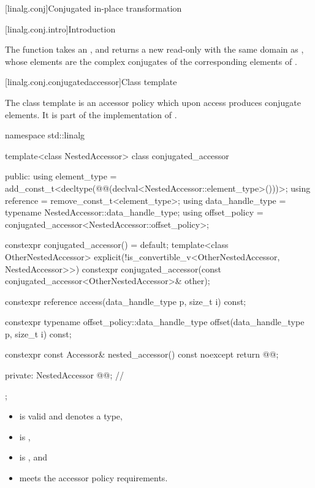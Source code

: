 [linalg.conj]{Conjugated in-place transformation}

[linalg.conj.intro]{Introduction}

\pnum
The  function takes an  ,
and returns a new read-only  
with the same domain as ,
whose elements are the complex conjugates
of the corresponding elements of .

[linalg.conj.conjugatedaccessor]{Class template }

\pnum
The class template 
is an  accessor policy
which upon access produces conjugate elements.
It is part of the implementation of
.

\begin{codeblock}
namespace std::linalg {
  template<class NestedAccessor>
  class conjugated_accessor {
  public:
    using element_type =
      add_const_t<decltype(@@(declval<NestedAccessor::element_type>()))>;
    using reference = remove_const_t<element_type>;
    using data_handle_type = typename NestedAccessor::data_handle_type;
    using offset_policy = conjugated_accessor<NestedAccessor::offset_policy>;

    constexpr conjugated_accessor() = default;
    template<class OtherNestedAccessor>
      explicit(!is_convertible_v<OtherNestedAccessor, NestedAccessor>>)
      constexpr conjugated_accessor(const conjugated_accessor<OtherNestedAccessor>& other);

    constexpr reference access(data_handle_type p, size_t i) const;

    constexpr typename offset_policy::data_handle_type
      offset(data_handle_type p, size_t i) const;

    constexpr const Accessor& nested_accessor() const noexcept { return @@; }

  private:
    NestedAccessor @@{};                           // \expos
  };
}
\end{codeblock}

\pnum
\mandates
\begin{itemize}
\item
{} is valid and denotes a type,
\item
{} is ,
\item
{} is , and
\item
{} meets the accessor policy requirements.
\end{itemize}

